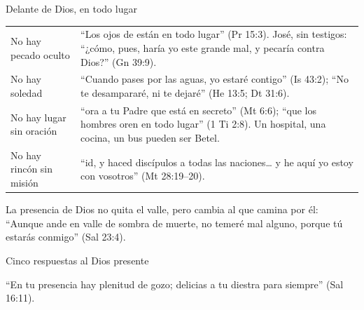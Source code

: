 \begin{frame}{Delante de Dios, en todo lugar}
\scriptsize\renewcommand{\arraystretch}{1.2}
\begin{tabular}{@{}>{\RaggedRight\arraybackslash}p{2.6cm}>{\RaggedRight\arraybackslash}p{9.2cm}@{}}
\toprule
No hay pecado oculto & ``Los ojos de \SENOR{} están en todo lugar'' (Pr 15:3). José, sin testigos: ``¿cómo, pues, haría yo este grande mal, y pecaría contra Dios?'' (Gn 39:9). \\
No hay soledad & ``Cuando pases por las aguas, yo estaré contigo'' (Is 43:2); ``No te desampararé, ni te dejaré'' (He 13:5; Dt 31:6). \\
No hay lugar sin oración & ``ora a tu Padre que está en secreto'' (Mt 6:6); ``que los hombres oren en todo lugar'' (1 Ti 2:8). Un hospital, una cocina, un bus pueden ser Betel. \\
No hay rincón sin misión & ``id, y haced discípulos a todas las naciones\ldots{} y he aquí yo estoy con vosotros'' (Mt 28:19--20). \\
\bottomrule
\end{tabular}\par\medskip
\small\RaggedRight La presencia de Dios no quita el valle, pero cambia al que camina por él: ``Aunque ande en valle de sombra de muerte, no temeré mal alguno, porque tú estarás conmigo'' (Sal 23:4).
\end{frame}

\begin{frame}{Cinco respuestas al Dios presente}
\centering
{}\par\medskip
\small\RaggedRight ``En tu presencia hay plenitud de gozo; delicias a tu diestra para siempre'' (Sal 16:11).
\end{frame}

